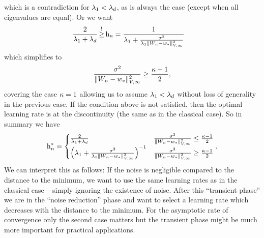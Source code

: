 which is a contradiction for \(\lambda_1 < \lambda_d\), as is
always the case (except when all eigenvalues are equal). Or we want
\begin{align*}
	&\frac{2}{\hesseEV_1+\hesseEV_\dimension} \xge{!} \lr_n
	= \frac{1}{
		\hesseEV_1 + \frac{\stdBound^2}{
			\hesseEV_1\|\Weights_n-\minimum\|_{V,\infty}^2
		}
	}
\end{align*}
which simplifies to
\begin{align*}
	\frac{\sigma^2}{
		\|W_n-w_*\|_{V,\infty}^2
	}
	\ge\frac{\kappa-1}{2},
\end{align*}
covering the case \(\kappa=1\) allowing us to assume \(\lambda_1 <
\lambda_d\) without loss of generality in the previous case. If
the condition above is not satisfied, then the optimal learning rate is at the
discontinuity (the same as in the classical case). So in summary we have
\begin{align*}
	\text{h}_n^* = \begin{cases}
		\frac{2}{\lambda_1+\lambda_d}
		&\frac{\sigma^2}{
			\|W_n-w_*\|_{V,\infty}^2
		}
		\le \frac{\kappa-1}{2}\\
		\left(
			\lambda_1 + \frac{\sigma^2}{
				\lambda_1\|W_n-w_*\|_{V,\infty}^2
			}
		\right)^{-1}
		&\frac{\sigma^2}{
			\|W_n-w_*\|_{V,\infty}^2
		}
		\ge \frac{\kappa-1}{2}
	\end{cases}.
\end{align*}
We can interpret this as follows: If the noise is negligible compared to the
distance to the minimum, we want to use the same learning rates as in the
classical case -- simply ignoring the existence of noise. After this ``transient
phase'' we are in the ``noise reduction'' phase and want to select a learning rate
which decreases with the distance to the minimum. For the asymptotic rate of
convergence only the second case matters but the transient phase might be much
more important for practical applications.

